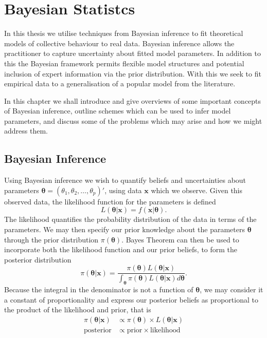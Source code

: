 \chapter{Bayesian Statistcs}	
\label{cha:bayes_intro}
In this thesis we utilise techniques from Bayesian inference to fit theoretical models of collective behaviour to real data. Bayesian inference allows the practitioner to capture uncertainty about fitted model parameters. In addition to this the Bayesian framework permits flexible model structures and potential inclusion of expert information via the prior distribution. With this we seek to fit empirical data to a generalisation of a popular model from the literature.

In this chapter we shall introduce and give overviews of some important concepts of Bayesian inference, outline schemes which can be used to infer model parameters, and discuss some of the problems which may arise and how we might address them.

\section{Bayesian Inference}
\label{sec:bayesian_inference}
Using Bayesian inference we wish to quantify beliefs and uncertainties about parameters $\bm{\theta} = (\theta_1, \theta_2,\dots,\theta_p)'$, using data $\bm{x}$ which we observe. Given this observed data, the likelihood function for the parameters is defined
\[
    L(\bm{\theta}|\bm{x}) = f(\bm{x}|\bm{\theta}).
\]
The likelihood quantifies the probability distribution of the data in terms of the parameters. We may then specify our prior knowledge about the parameters $\bm{\theta}$ through the prior distribution $\pi(\bm{\theta})$. Bayes Theorem can then be used to incorporate both the likelihood function and our prior beliefs, to form the posterior distribution
\begin{equation}
\label{eq:bayes_theorem}
    \pi(\bm{\theta}|\bm{x}) = \frac{\pi({\bm{\theta}})L(\bm{\theta}|\bm{x})}{\int_{\bm{\theta}} \pi(\bm{\theta})L(\bm{\theta}|\bm{x})d\bm{\theta}}.
\end{equation}
Because the integral in the denominator is not a function of $\bm{\theta}$, we may consider it a constant of proportionality and express our posterior beliefs as proportional to the product of the likelihood and prior, that is
\begin{align*}
    \pi(\bm{\theta}|\bm{x}) &\propto \pi(\bm{\theta}) \times L(\bm{\theta}|\bm{x})\\
    \text{posterior} &\propto \text{prior} \times \text{likelihood}
\end{align*}

